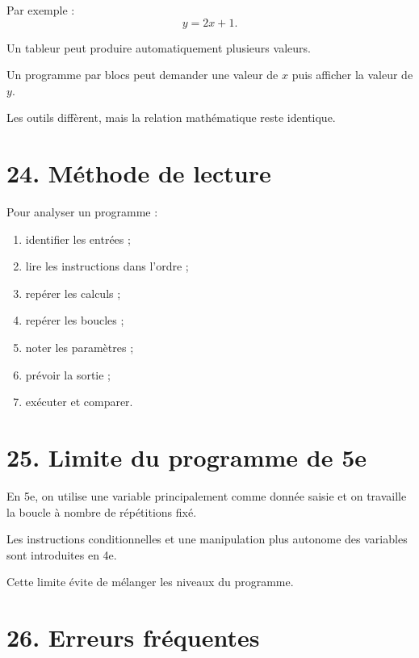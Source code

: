 Par exemple :
\[
y=2x+1.
\]

Un tableur peut produire automatiquement plusieurs valeurs.

Un programme par blocs peut demander une valeur de $x$ puis afficher la valeur de $y$.

Les outils diffèrent, mais la relation mathématique reste identique.

\section{24. Méthode de lecture}

\begin{methode}
Pour analyser un programme :
\begin{enumerate}
\item identifier les entrées ;
\item lire les instructions dans l'ordre ;
\item repérer les calculs ;
\item repérer les boucles ;
\item noter les paramètres ;
\item prévoir la sortie ;
\item exécuter et comparer.
\end{enumerate}
\end{methode}

\section{25. Limite du programme de 5e}

\begin{attention}
En 5e, on utilise une variable principalement comme donnée saisie et on travaille la boucle à nombre de répétitions fixé.

Les instructions conditionnelles et une manipulation plus autonome des variables sont introduites en 4e.
\end{attention}

Cette limite évite de mélanger les niveaux du programme.

\section{26. Erreurs fréquentes}

